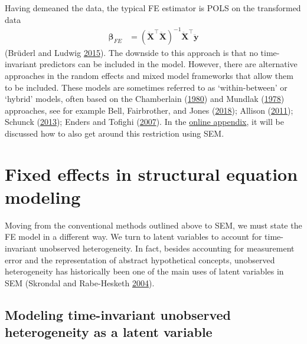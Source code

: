 \documentclass[
  12pt,
  a4paper]{article}
\begin{document}
Having demeaned the data, the typical FE estimator is POLS on the
transformed data \begin{align}
\bm{\beta}_{FE} & = (\ddot{\bm{X}}^{\intercal}\ddot{\bm{X}})^{-1}\ddot{\bm{X}}^{\intercal}\ddot{\bm{y}}
\end{align} (Brüderl and Ludwig
\protect\hyperlink{ref-Bruederl2015}{2015}). The downside to this
approach is that no time-invariant predictors can be included in the
model. However, there are alternative approaches in the random effects
and mixed model frameworks that allow them to be included. These models
are sometimes referred to as `within-between' or `hybrid' models, often
based on the Chamberlain (\protect\hyperlink{ref-Chamberlain1980}{1980})
and Mundlak (\protect\hyperlink{ref-Mundlak1978}{1978}) approaches, see
for example Bell, Fairbrother, and Jones
(\protect\hyperlink{ref-Bell2018}{2018}); Allison
(\protect\hyperlink{ref-Allison2011}{2011}); Schunck
(\protect\hyperlink{ref-Schunck2013}{2013}); Enders and Tofighi
(\protect\hyperlink{ref-Enders2007}{2007}). In the
\href{https://github.com/henrik-andersen/FE-SEM/blob/master/extensions.pdf}{online
appendix}, it will be discussed how to also get around this restriction
using SEM.

\hypertarget{fe-sem}{%
\section{Fixed effects in structural equation modeling}\label{fe-sem}}

Moving from the conventional methods outlined above to SEM, we must
state the FE model in a different way. We turn to latent variables to
account for time-invariant unobserved heterogeneity. In fact, besides
accounting for measurement error and the representation of abstract
hypothetical concepts, unobserved heterogeneity has historically been
one of the main uses of latent variables in SEM (Skrondal and
Rabe-Hesketh \protect\hyperlink{ref-Skrondal2004}{2004}).

\hypertarget{modeling-time-invariant-unobserved-heterogeneity-as-a-latent-variable}{%
\subsection{Modeling time-invariant unobserved heterogeneity as a latent
variable}\label{modeling-time-invariant-unobserved-heterogeneity-as-a-latent-variable}}
\end{document}
